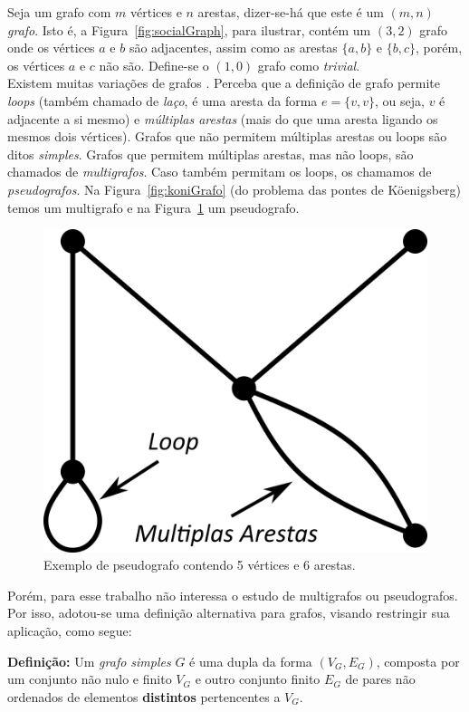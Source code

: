 \documentclass[a4paper,12pt]{article}
\begin{document}
Seja um grafo com $m$ vértices e $n$ arestas, dizer-se-há que este é um $(m, n)$ \textit{grafo}. Isto é, a Figura~\ref{fig:socialGraph}, para ilustrar, contém um $(3,2)$ grafo onde os vértices $a$ e $b$ são adjacentes, assim como as arestas $\{a, b\}$ e $\{b, c\}$, porém, os vértices $a$ e $c$ não são.
Define-se o $(1,0)$ grafo como \textit{trivial}.
\\

Existem muitas variações de grafos \cite{graphTheoryFHarary}. Perceba que a definição de grafo permite \textit{loops} (também chamado de \textit{laço}, é uma aresta da forma $e = \{v,v\}$, ou seja, $v$ é adjacente a si mesmo) e \textit{múltiplas arestas} (mais do que uma aresta ligando os mesmos dois vértices). Grafos que não permitem múltiplas arestas ou loops são ditos \textit{simples}. Grafos que permitem múltiplas arestas, mas não loops, são chamados de \textit{multigrafos}. Caso também permitam os loops, os chamamos de \textit{pseudografos}. Na Figura~\ref{fig:koniGrafo} (do problema das pontes de Köenigsberg) temos um multigrafo e na Figura~\ref{fig:pseudograph} um pseudografo.

\begin{figure}[H]
	\begin{center}
		\includegraphics[width=0.28\linewidth]{figures/pseudograph.png}
	\end{center}
	\caption{Exemplo de pseudografo contendo 5 vértices e 6 arestas.}
	\label{fig:pseudograph}
\end{figure}

Porém, para esse trabalho não interessa o estudo de multigrafos ou pseudografos. Por isso, adotou-se uma definição alternativa para grafos, visando restringir sua aplicação, como segue:

\begin{center}
	\begin{minipage}{0.9 \linewidth}
		\textbf{Definição:} Um \textit{grafo simples} $G$ é uma dupla da forma $(V_G,E_G)$, composta por um conjunto não nulo e finito $V_G$ e outro conjunto finito $E_G$ de pares não ordenados de elementos \textbf{distintos} pertencentes a $V_G$.
	\end{minipage}
\end{center} 
\end{document}
